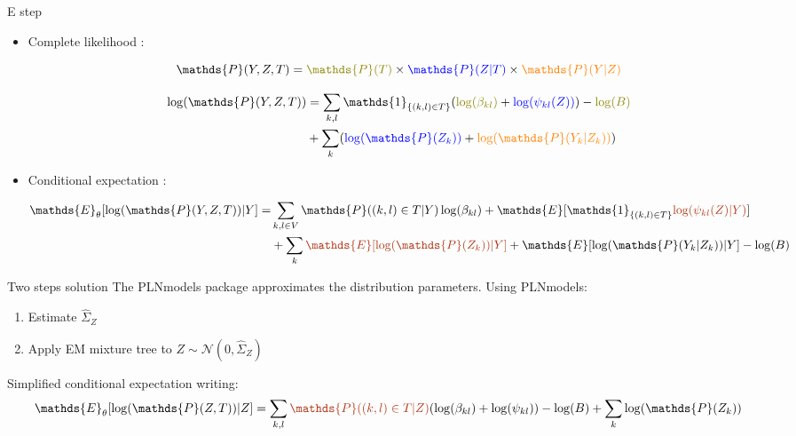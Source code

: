 \documentclass[9pt]{beamer}
\newcommand{\emphase}[1]{\textcolor{Complement}{#1}}
\begin{document}
\begin{frame}{E step}

\begin{itemize}
    \item Complete likelihood :

 \[ \mathds{P}(Y,Z,T) = \color{olive}\mathds{P}(T)\color{black}\times\color{blue}\mathds{P}(Z|T)\color{black}\times\color{orange}\mathds{P}(Y|Z)\]
 
\begin{align*}
 \log(\mathds{P}(Y,Z,T)) &= \sum_{k,l} \mathds{1}_{\{(k,l) \in T\}} (\color{olive}\log(\beta_{kl})\color{black} + \color{blue}\log(\psi_{kl}(Z)) \color{black})-\color{olive}\log(B)\color{black} \\
 &+\sum_k (\color{blue} \log(\mathds{P}(Z_k))\color{black} + \color{orange}\log(\mathds{P}(Y_k|Z_k))\color{black})
 \end{align*}
 
 \pause
 \item Conditional expectation :

\begin{align*}
    \mathds{E}_\theta[\log(\mathds{P}(Y,Z,T))|Y] =&\sum_{k,l\in V} \mathds{P}((k,l) \in T|Y) \log(\beta_{kl}) + \mathds{E}[\mathds{1}_{\{(k,l) \in T\}}\emphase{\log(\psi_{kl}(Z)|Y)}]\\
& +\sum_k \emphase{\mathds{E}[\log(\mathds{P}(Z_k)) | Y]} + \mathds{E}[\log(\mathds{P}(Y_k|Z_k)) | Y]-\log(B)
\end{align*} 
\end{itemize}
\end{frame}


\begin{frame}{Two steps solution}
   The {\selectfont
PLNmodels} package approximates the distribution parameters. Using {\selectfont
PLNmodels}:
    \vspace{0.3cm}
    \begin{enumerate}
        \item Estimate $\hat{\Sigma}_Z$ \vspace{0.2cm}
        \item Apply EM mixture tree to $Z \sim \mathcal{N}(0,\hat{\Sigma}_Z)$\\
    \end{enumerate}
\vspace{1.5cm}
Simplified conditional expectation writing:\\
\vspace{0.2cm}
\[\mathds{E}_\theta[\log(\mathds{P}(Z,T))|Z] =\sum_{k,l}  \emphase{\mathds{P}((k,l) \in T|Z)}(\log(\beta_{kl}) + \log(\psi_{kl}) )-\log(B) +\sum_k \log(\mathds{P}(Z_k))\]
\end{frame}
\end{document}

